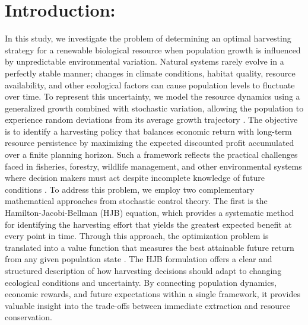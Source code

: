 \documentclass[11pt]{article}
\begin{document}
	\section{Introduction:}
	In this study, we investigate the problem of determining an optimal harvesting strategy for a renewable biological resource when population growth is influenced by unpredictable environmental variation. Natural systems rarely evolve in a perfectly stable manner; changes in climate conditions, habitat quality, resource availability, and other ecological factors can cause population levels to fluctuate over time. To represent this uncertainty, we model the resource dynamics using a generalized growth combined with stochastic variation, allowing the population to experience random deviations from its average growth trajectory \citep{pramanik2020optimization,pramanik2023semicooperation}. The objective is to identify a harvesting policy that balances economic return with long-term resource persistence by maximizing the expected discounted profit accumulated over a finite planning horizon. Such a framework reflects the practical challenges faced in fisheries, forestry, wildlife management, and other environmental systems where decision makers must act despite incomplete knowledge of future conditions \citep{kakkat2026angiotensin}. To address this problem, we employ two complementary mathematical approaches from stochastic control theory. The first is the Hamilton-Jacobi-Bellman (HJB) equation, which provides a systematic method for identifying the harvesting effort that yields the greatest expected benefit at every point in time. Through this approach, the optimization problem is translated into a value function that measures the best attainable future return from any given population state \citep{pramanik2020motivation}. The HJB formulation offers a clear and structured description of how harvesting decisions should adapt to changing ecological conditions and uncertainty. By connecting population dynamics, economic rewards, and future expectations within a single framework, it provides valuable insight into the trade-offs between immediate extraction and resource conservation.
	
\end{document}
